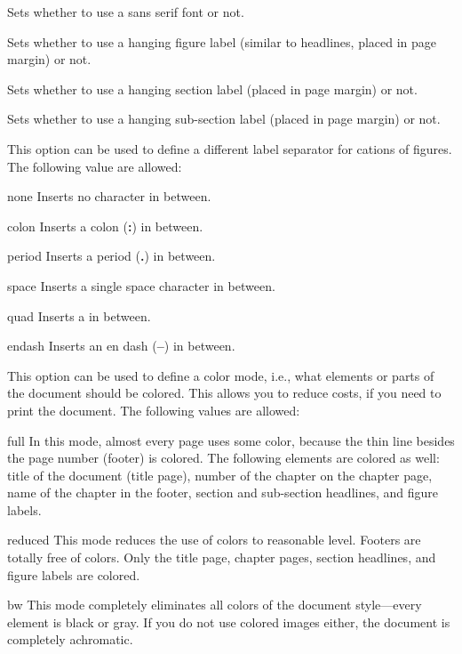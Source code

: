 \documentclass{ltxdockit}
\begin{document}
\begin{optionlist}


Sets whether to use a sans serif font or not.


Sets whether to use a hanging figure label (similar to headlines, placed in page margin) or not.


Sets whether to use a hanging section label (placed in page margin) or not.


Sets whether to use a hanging sub-section label (placed in page margin) or not.


This option can be used to define a different label separator for cations of figures. The following value are allowed:

\begin{valuelist}
\item[none] Inserts no character in between.
\item[colon] Inserts a colon (\textbf{:}) in between.
\item[period] Inserts a period (\textbf{.}) in between.
\item[space] Inserts a single space character in between.
\item[quad] Inserts a \cmd{\\quad} in between.
\item[endash] Inserts an en dash (\textbf{--}) in between.
\end{valuelist}


This option can be used to define a color mode, i.e., what elements or parts of the document should be colored.
This allows you to reduce costs, if you need to print the document.
The following values are allowed:

\begin{valuelist}
\item[full] In this mode, almost every page uses some color, because the thin line besides the page number (footer) is colored.
	The following elements are colored as well: title of the document (title page), number of the chapter on the chapter page, name of the chapter in the footer, section and sub-section headlines, and figure labels.
\item[reduced] This mode reduces the use of colors to reasonable level.
	Footers are totally free of colors.
	Only the title page, chapter pages, section headlines, and figure labels are colored.
\item[bw] This mode completely eliminates all colors of the document style---every element is black or gray.
	If you do not use colored images either, the document is completely achromatic.
\end{valuelist}


\end{optionlist}
\end{document}
